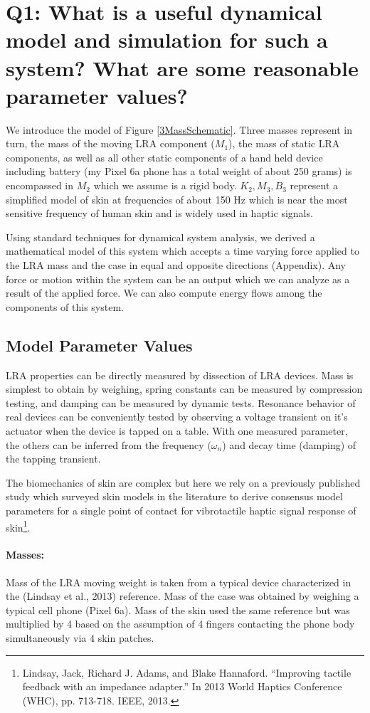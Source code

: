 \documentclass[letterpaper,11pt]{article}
\begin{document}
\section{Q1: What is a useful dynamical model and simulation for such a system? What are some reasonable parameter values?}

We introduce the model of Figure \ref{3MassSchematic}.  Three masses represent in turn, the mass of the moving LRA component ($M_1$),
the mass of static LRA components, as well as all other static components of a hand held device including battery (my Pixel 6a phone
has a total weight of about 250 grams) is encompassed in $M_2$ which we assume is a rigid body.
$K_2, M_3, B_3$ represent a simplified model of skin at frequencies of about 150 Hz which is
near the most sensitive frequency of human skin and is widely used in haptic signals.

Using standard techniques for dynamical system analysis, we derived a mathematical model of this system which accepts a time varying force
applied to the LRA mass and the case in equal and opposite directions (Appendix).   Any force or motion within the system can be an output which we can
analyze as a result of the applied force.  We can also compute energy flows among the components of this system.

\subsection{Model Parameter Values}
LRA properties can be directly measured by dissection of LRA devices.  Mass is simplest to obtain by weighing, spring constants can be measured by
compression testing, and damping can be measured by dynamic tests.   Resonance behavior of real devices can be conveniently tested by observing
a voltage transient on it's actuator when the device is tapped on a table.   With one measured parameter, the others can be inferred from the
frequency ($\omega_n$) and decay time (damping) of the tapping transient.

The biomechanics of skin are complex but here we rely on a previously published study which surveyed skin models in the literature to
derive consensus model parameters for a single point of contact for vibrotactile haptic signal response of skin\footnote{Lindsay, Jack, Richard J. Adams, and Blake Hannaford. ``Improving tactile feedback with an impedance adapter.'' In 2013 World Haptics Conference (WHC), pp. 713-718. IEEE, 2013.
}.
\paragraph{Masses:}
Mass of the LRA moving weight is taken from a typical device characterized in the (Lindsay et al., 2013) reference.   Mass of the case was
obtained by weighing a typical cell phone (Pixel 6a).   Mass of the skin used the same reference but was multiplied by 4 based on the assumption of
4 fingers contacting the phone body simultaneously via 4 skin patches.
\end{document}
